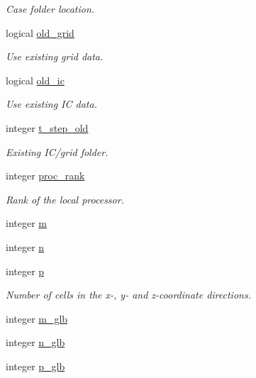\begin{DoxyCompactItemize}
\begin{DoxyCompactList}\small\item\em Case folder location. \end{DoxyCompactList}\item 
logical \hyperlink{namespacem__global__parameters_a971692c50b4725d4724238b8a01a722e}{old\+\_\+grid}
\begin{DoxyCompactList}\small\item\em Use existing grid data. \end{DoxyCompactList}\item 
logical \hyperlink{namespacem__global__parameters_ae83688439601a9ff9bad58f09357a721}{old\+\_\+ic}
\begin{DoxyCompactList}\small\item\em Use existing IC data. \end{DoxyCompactList}\item 
integer \hyperlink{namespacem__global__parameters_a5d0554c4fef91acf46f683e8bcd29133}{t\+\_\+step\+\_\+old}
\begin{DoxyCompactList}\small\item\em Existing I\+C/grid folder. \end{DoxyCompactList}\item 
integer \hyperlink{namespacem__global__parameters_a383c6ff025d4ea09ddd4e2356042d86b}{proc\+\_\+rank}
\begin{DoxyCompactList}\small\item\em Rank of the local processor. \end{DoxyCompactList}\item 
integer \hyperlink{namespacem__global__parameters_aee38c9d03e9195858a93ec611b605f33}{m}
\item 
integer \hyperlink{namespacem__global__parameters_ac72422e5f77149bd32cf0cfd01a36544}{n}
\item 
integer \hyperlink{namespacem__global__parameters_ac040dbf547e6d5de8df08e864d8131e7}{p}
\begin{DoxyCompactList}\small\item\em Number of cells in the x-\/, y-\/ and z-\/coordinate directions. \end{DoxyCompactList}\item 
integer \hyperlink{namespacem__global__parameters_ad4e160df8d0de7ea1801a1ca29f8e9b0}{m\+\_\+glb}
\item 
integer \hyperlink{namespacem__global__parameters_adab11dab474410541d4c37725bea01e1}{n\+\_\+glb}
\item 
integer \hyperlink{namespacem__global__parameters_a1072f221ca8e41b0ea3240b33374cc1e}{p\+\_\+glb}

\end{DoxyCompactItemize}
